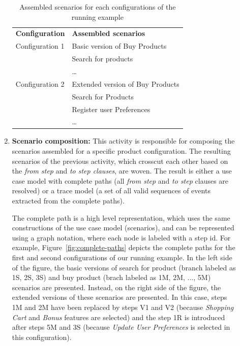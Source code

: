 \documentclass{acm_proc_article-sp}
\begin{document}
\begin{description}
\begin{enumerate}
\begin{table}[h]
\begin{center}
\caption{Assembled scenarios for each configurations of the running example} \label{tab:assembled-scenarios}
\begin{tabular}{ll}
   \hline\noalign{\smallskip}
  {\bf Configuration} & {\bf Assembled scenarios} \\
   \noalign{\smallskip}
   \hline
   \noalign{\smallskip}
    Configuration 1\hspace{15pt} & Basic version of Buy Products \\
                             & Search for products \\
                             & \ldots \\
   Configuration 2 & Extended version of Buy Products \\
                             & Search for Products	 \\
                             & Register user Preferences \\
                             & \ldots       \\
  \hline
\end{tabular}
\end{center}
\end{table}
 
 \item {\bf Scenario composition:} This activity is responsible for composing the scenarios assembled for a specific product configuration. 
 The resulting scenarios of the previous activity, which crosscut each other based on the \emph{from step} and \emph{to step clauses}, are woven. The 
 result is either a use case model with complete paths (all \emph{from step} and \emph{to step} clauses are resolved) or a trace model (a set of all valid sequences of events extracted from the complete paths). 
 
The complete path is a high level representation, which uses the same constructions of the use case model (scenarios), and can be represented using a graph notation, where each node is labeled with a step id. For example, Figure~\ref{fig:complete-paths} depicts the complete paths for the first and second configurations of our running example. In the left side of the figure,  the basic versions of search for product (branch labeled as 1S, 2S, 3S) and buy product (brach labeled as 1M, 2M, ..., 5M) scenarios are presented. Instead, on the right side of the figure, the extended versions of these scenarios are presented. In this case, steps 1M and 2M have been replaced by steps V1 and V2 (because \emph{Shopping Cart} and \emph{Bonus} features are selected) and the step  1R is introduced after steps 5M and 3S (because \emph{Update User Preferences} is selected in this configuration).
 

\end{enumerate}
\end{description}
\end{document}
